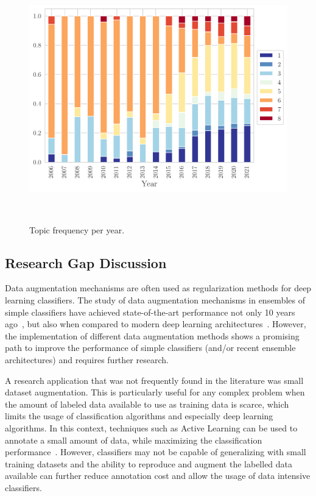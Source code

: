 \documentclass[parskip=full]{scrartcl}
\begin{document}
\begin{figure}[H]
	\centering
    \includegraphics[width=\linewidth]{../analysis/topics_per_year}
    \caption{Topic frequency per year.
    }~\label{fig:topics_per_year}
\end{figure}

\subsection{Research Gap Discussion}

Data augmentation mechanisms are often used as regularization methods for
deep learning classifiers. The study of data augmentation mechanisms in
ensembles of simple classifiers have achieved state-of-the-art performance not
only 10 years ago~\cite{Meier2011, Ciresan2011}, but also when compared to
modern deep learning architectures~\cite{Tolstikhin2021, Touvron2021,
Liu2021}. However, the implementation of different data augmentation methods
shows a promising path to improve the performance of simple classifiers
(and/or recent ensemble architectures) and requires further research.

A research application that was not frequently found in the literature was
small dataset augmentation. This is particularly useful for any complex
problem when the amount of labeled data available to use as training data is
scarce, which limits the usage of classification algorithms and especially
deep learning algorithms. In this context, techniques such as Active Learning
can be used to annotate a small amount of data, while maximizing the
classification performance~\cite{Su2020}. However, classifiers may not be
capable of generalizing with small training datasets and the ability to
reproduce and augment the labelled data available can further reduce
annotation cost and allow the usage of data intensive classifiers.
\end{document}
